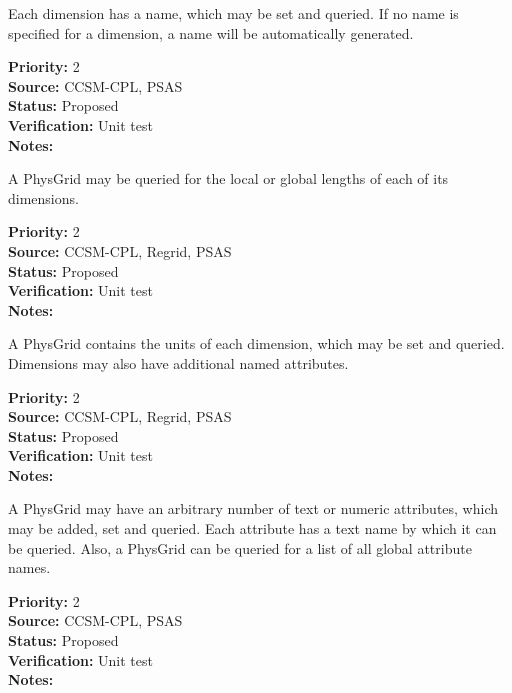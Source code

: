 Each dimension has a name, which may be set and queried.  If no name is specified
for a dimension, a name will be automatically generated.
\begin{reqlist}
{\bf Priority:} 2 \\
{\bf Source:} CCSM-CPL, 
PSAS \\
{\bf Status:} Proposed \\
{\bf Verification:} Unit test \\
{\bf Notes:} 
\end{reqlist}

A PhysGrid may be queried for the local or global lengths of each of its dimensions.
\begin{reqlist}
{\bf Priority:} 2 \\
{\bf Source:} CCSM-CPL, Regrid, 
PSAS \\
{\bf Status:} Proposed \\
{\bf Verification:} Unit test \\
{\bf Notes:} 
\end{reqlist}

A PhysGrid contains the units of each dimension, which may be set and queried. 
Dimensions may also have additional named attributes.
\begin{reqlist}
{\bf Priority:} 2 \\
{\bf Source:} CCSM-CPL, Regrid, 
PSAS  \\
{\bf Status:} Proposed \\
{\bf Verification:} Unit test \\
{\bf Notes:} 
\end{reqlist}

A PhysGrid may have an arbitrary number of text or numeric attributes,
which may be added, set and queried.  Each attribute has a text name by which it
can be queried.  Also, a PhysGrid can be queried for a list of all global
attribute names.

\begin{reqlist}
{\bf Priority:} 2 \\
{\bf Source:} CCSM-CPL, 
PSAS  \\
{\bf Status:} Proposed \\
{\bf Verification:} Unit test \\
{\bf Notes:} 
\end{reqlist}

